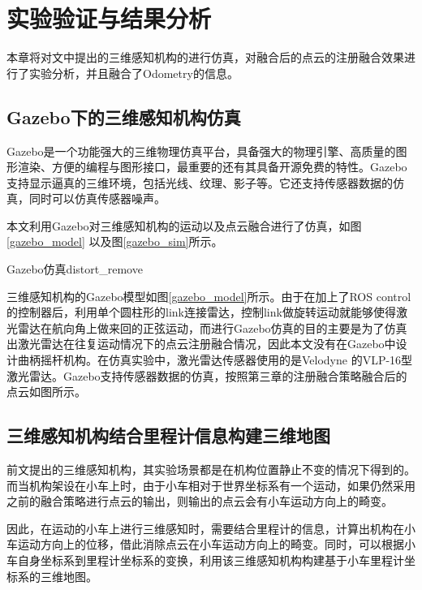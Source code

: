 
\chapter{实验验证与结果分析}
本章将对文中提出的三维感知机构的进行仿真，对融合后的点云的注册融合效果进行了实验分析，并且融合了Odometry的信息。

\section{Gazebo下的三维感知机构仿真}

Gazebo是一个功能强大的三维物理仿真平台，具备强大的物理引擎、高质量的图形渲染、方便的编程与图形接口，最重要的还有其具备开源免费的特性。Gazebo支持显示逼真的三维环境，包括光线、纹理、影子等。它还支持传感器数据的仿真，同时可以仿真传感器噪声。

本文利用Gazebo对三维感知机构的运动以及点云融合进行了仿真，如图\ref{gazebo_model} 以及图\ref{gazebo_sim}所示。

\begin{pics}[htbp]{Gazebo仿真}{distort_remove}
\end{pics}

三维感知机构的Gazebo模型如图\ref{gazebo_model}所示。由于在加上了ROS control的控制器后，利用单个圆柱形的link连接雷达，控制link做旋转运动就能够使得激光雷达在航向角上做来回的正弦运动，而进行Gazebo仿真的目的主要是为了仿真出激光雷达在往复运动情况下的点云注册融合情况，因此本文没有在Gazebo中设计曲柄摇杆机构。在仿真实验中，激光雷达传感器使用的是Velodyne 的VLP-16型激光雷达。Gazebo支持传感器数据的仿真，按照第三章的注册融合策略融合后的点云如图所示。

\section{三维感知机构结合里程计信息构建三维地图}

前文提出的三维感知机构，其实验场景都是在机构位置静止不变的情况下得到的。而当机构架设在小车上时，由于小车相对于世界坐标系有一个运动，如果仍然采用之前的融合策略进行点云的输出，则输出的点云会有小车运动方向上的畸变。

因此，在运动的小车上进行三维感知时，需要结合里程计的信息，计算出机构在小车运动方向上的位移，借此消除点云在小车运动方向上的畸变。同时，可以根据小车自身坐标系到里程计坐标系的变换，利用该三维感知机构构建基于小车里程计坐标系的三维地图。

